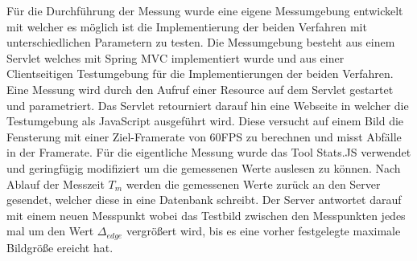 Für die Durchführung der Messung wurde eine eigene Messumgebung entwickelt mit welcher es möglich ist die Implementierung der beiden Verfahren mit unterschiedlichen Parametern zu testen.
Die Messumgebung besteht aus einem Servlet welches mit Spring MVC implementiert wurde und aus einer Clientseitigen Testumgebung für die Implementierungen der beiden Verfahren.
Eine Messung wird durch den Aufruf einer Resource auf dem Servlet gestartet und parametriert.
Das Servlet retourniert darauf hin eine Webseite in welcher die Testumgebung als JavaScript ausgeführt wird.
Diese versucht auf einem Bild die Fensterung mit einer Ziel-Framerate von 60FPS zu berechnen und misst Abfälle in der Framerate.
Für die eigentliche Messung wurde das Tool Stats.JS verwendet und geringfügig modifiziert um die gemessenen Werte auslesen zu können.
Nach Ablauf der Messzeit $T_m$ werden die gemessenen Werte zurück an den Server gesendet, welcher diese in eine Datenbank schreibt.
Der Server antwortet darauf mit einem neuen Messpunkt wobei das Testbild zwischen den Messpunkten jedes mal um den Wert $\Delta_{edge}$ vergrößert wird, 
bis es eine vorher festgelegte maximale Bildgröße ereicht hat.

